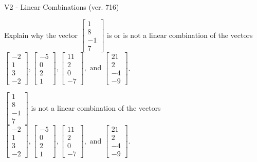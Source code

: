 \begin{exercise}
  \begin{exerciseTitle}V2 - Linear Combinations (ver. 716)\end{exerciseTitle}
  \begin{exerciseStatement}
    Explain why the vector \(\left[\begin{array}{c}
1 \\
8 \\
-1 \\
7
\end{array}\right]\)  is or is not a linear 
	combination of the vectors \(\left[\begin{array}{c}
-2 \\
1 \\
3 \\
-2
\end{array}\right] , \left[\begin{array}{c}
-5 \\
0 \\
2 \\
1
\end{array}\right] , \left[\begin{array}{c}
11 \\
2 \\
0 \\
-7
\end{array}\right] , \text{ and } \left[\begin{array}{c}
21 \\
2 \\
-4 \\
-9
\end{array}\right]\).
	


  \end{exerciseStatement}
  \begin{exerciseAnswer}
   \(\left[\begin{array}{c}
1 \\
8 \\
-1 \\
7
\end{array}\right]\) 
  	 is not  
	a linear combination of the vectors \(\left[\begin{array}{c}
-2 \\
1 \\
3 \\
-2
\end{array}\right] , \left[\begin{array}{c}
-5 \\
0 \\
2 \\
1
\end{array}\right] , \left[\begin{array}{c}
11 \\
2 \\
0 \\
-7
\end{array}\right] , \text{ and } \left[\begin{array}{c}
21 \\
2 \\
-4 \\
-9
\end{array}\right]\).


\end{exerciseAnswer}
\end{exercise}

